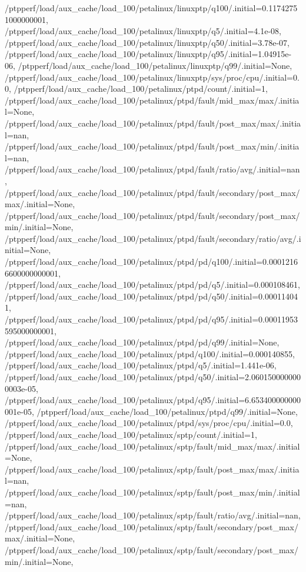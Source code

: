 {    /ptpperf/load/aux_cache/load_100/petalinux/linuxptp/q100/.initial=0.11742751000000001,
    /ptpperf/load/aux_cache/load_100/petalinux/linuxptp/q5/.initial=4.1e-08,
    /ptpperf/load/aux_cache/load_100/petalinux/linuxptp/q50/.initial=3.78e-07,
    /ptpperf/load/aux_cache/load_100/petalinux/linuxptp/q95/.initial=1.04915e-06,
    /ptpperf/load/aux_cache/load_100/petalinux/linuxptp/q99/.initial=None,
    /ptpperf/load/aux_cache/load_100/petalinux/linuxptp/sys/proc/cpu/.initial=0.0,
    /ptpperf/load/aux_cache/load_100/petalinux/ptpd/count/.initial=1,
    /ptpperf/load/aux_cache/load_100/petalinux/ptpd/fault/mid_max/max/.initial=None,
    /ptpperf/load/aux_cache/load_100/petalinux/ptpd/fault/post_max/max/.initial=nan,
    /ptpperf/load/aux_cache/load_100/petalinux/ptpd/fault/post_max/min/.initial=nan,
    /ptpperf/load/aux_cache/load_100/petalinux/ptpd/fault/ratio/avg/.initial=nan,
    /ptpperf/load/aux_cache/load_100/petalinux/ptpd/fault/secondary/post_max/max/.initial=None,
    /ptpperf/load/aux_cache/load_100/petalinux/ptpd/fault/secondary/post_max/min/.initial=None,
    /ptpperf/load/aux_cache/load_100/petalinux/ptpd/fault/secondary/ratio/avg/.initial=None,
    /ptpperf/load/aux_cache/load_100/petalinux/ptpd/pd/q100/.initial=0.00012166600000000001,
    /ptpperf/load/aux_cache/load_100/petalinux/ptpd/pd/q5/.initial=0.000108461,
    /ptpperf/load/aux_cache/load_100/petalinux/ptpd/pd/q50/.initial=0.000114041,
    /ptpperf/load/aux_cache/load_100/petalinux/ptpd/pd/q95/.initial=0.00011953595000000001,
    /ptpperf/load/aux_cache/load_100/petalinux/ptpd/pd/q99/.initial=None,
    /ptpperf/load/aux_cache/load_100/petalinux/ptpd/q100/.initial=0.000140855,
    /ptpperf/load/aux_cache/load_100/petalinux/ptpd/q5/.initial=1.441e-06,
    /ptpperf/load/aux_cache/load_100/petalinux/ptpd/q50/.initial=2.0601500000000003e-05,
    /ptpperf/load/aux_cache/load_100/petalinux/ptpd/q95/.initial=6.653400000000001e-05,
    /ptpperf/load/aux_cache/load_100/petalinux/ptpd/q99/.initial=None,
    /ptpperf/load/aux_cache/load_100/petalinux/ptpd/sys/proc/cpu/.initial=0.0,
    /ptpperf/load/aux_cache/load_100/petalinux/sptp/count/.initial=1,
    /ptpperf/load/aux_cache/load_100/petalinux/sptp/fault/mid_max/max/.initial=None,
    /ptpperf/load/aux_cache/load_100/petalinux/sptp/fault/post_max/max/.initial=nan,
    /ptpperf/load/aux_cache/load_100/petalinux/sptp/fault/post_max/min/.initial=nan,
    /ptpperf/load/aux_cache/load_100/petalinux/sptp/fault/ratio/avg/.initial=nan,
    /ptpperf/load/aux_cache/load_100/petalinux/sptp/fault/secondary/post_max/max/.initial=None,
    /ptpperf/load/aux_cache/load_100/petalinux/sptp/fault/secondary/post_max/min/.initial=None,
}
